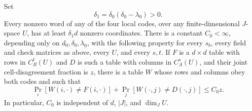 \begin{lemma}\label{oc:local-agreement}
Set
\begin{equation}\label{oc:delta-one}
 \delta_1=\delta_0(\delta_0-\lambda_0)>0.
\end{equation}
Every nonzero word of any of the four local codes, over any
finite-dimensional $J$-space $U$, has at least $\delta_1d$ nonzero
coordinates.  There is a constant $C_0<\infty$, depending only on
$d_0,\delta_0,\lambda_0$, with the following property for every $s_b$,
every field and check matrices as above, every $U$, and every $s,t$.
If $F$ is a $d\times d$ table with rows in $C_B^t(U)$ and $D$ is such
a table with columns in $C_A^s(U)$, and their joint cell-disagreement
fraction is $z$, there is a table $W$ whose rows and columns obey both
codes and such that
\begin{equation}\label{oc:tensor-agreement}
 \Pr_i[W(i,\cdot)\ne F(i,\cdot)]
 +\Pr_j[W(\cdot,j)\ne D(\cdot,j)]\le C_0z.
\end{equation}
In particular, $C_0$ is independent of $d$, $|J|$, and $\dim_JU$.
\end{lemma}

